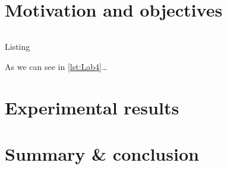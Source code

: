 \documentclass[12pt]{report}
\begin{document}
    \chapter*{Motivation and objectives}\label{ch:sec1}

    \begin{listing}
        \inputminted[linenos=true, breaklines=true, bgcolor=mintedBG, stripall=true]{r}{lab4.R}
        \caption{Listing}
        \label{lst:Lab4}
    \end{listing}

        \pagebreak
    As we can see in \ref{lst:Lab4}\ldots

    \chapter*{Experimental results}\label{ch:sec2}

    

    \chapter*{Summary \& conclusion}\label{ch:sec3}

    
\end{document}
